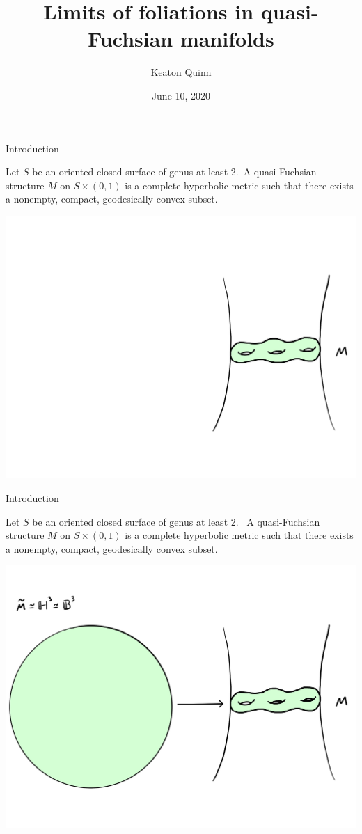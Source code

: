 \documentclass[professionalfont]{beamer}
\title{Limits of foliations in quasi-Fuchsian manifolds}
\author{Keaton Quinn}
\institute{University of Illinois at Chicago}
\date{June 10, 2020}
\begin{document}
\begin{frame}
\titlepage
\end{frame}




\begin{frame}{Introduction}

Let $S$ be an oriented closed surface of genus at least 2.\pause  \ A quasi-Fuchsian structure $M$ on $S \times (0,1)$ is a complete hyperbolic metric such that there exists a nonempty, compact, geodesically convex subset. \pause


\centering\includegraphics[scale=0.09]{QF-1.jpg}
	


\end{frame}




\begin{frame}{Introduction}

Let $S$ be an oriented closed surface of genus at least 2.  \ A quasi-Fuchsian structure $M$ on $S \times (0,1)$ is a complete hyperbolic metric such that there exists a nonempty, compact, geodesically convex subset.


\centering\includegraphics[scale=0.09]{QF-2.jpg}
	


\end{frame}
\end{document}

